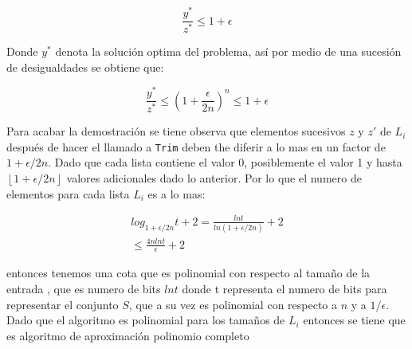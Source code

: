 \documentclass{article}
\begin{document}
  \begin{equation*}
    \frac{y^{*}}{z^{*}} \leq 1 + \epsilon
  \end{equation*}
  
Donde $y^{*}$ denota la solución optima del problema, así por medio de una sucesión de desigualdades se obtiene que:

  \begin{equation*}
    \frac{y^{*}}{z^{*}} \leq (1 + \frac{\epsilon}{2n})^n \leq 1 + \epsilon         \end{equation*}
    
Para acabar la demostración se tiene observa que elementos sucesivos $z$ y $z'$ de $L_i$ después de hacer el llamado a \texttt{Trim} deben the diferir a lo mas en un factor de $1 + \epsilon / 2n$. Dado que cada lista contiene el valor 0, posiblemente el valor 1 y hasta $\left \lfloor 1 + \epsilon / 2n \right \rfloor$ valores adicionales dado lo anterior. Por lo que el numero de elementos para cada lista $L_i$ es a lo mas:

  \begin{eqnarray}
    log_{1 + \epsilon/2n} t + 2 = \frac{ln t}{ln(1 + \epsilon/2n)} + 2\\
    \leq \frac{4n lnt}{\epsilon} + 2
  \end{eqnarray}

entonces tenemos una cota que es polinomial con respecto al tamaño de la entrada , que es numero de bits $ln t$ donde t representa el numero de bits para representar el conjunto $S$, que a su vez es polinomial con respecto a $n$ y a $1/\epsilon$. Dado que el algoritmo es polinomial para los tamaños de $L_i$ entonces se tiene que es algoritmo de aproximación polinomio completo
\end{document}
